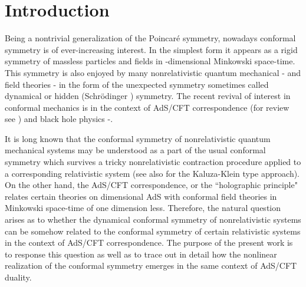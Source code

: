 \documentclass[a4paper,12pt]{article}
\begin{document}
\bigskip
\section{\protect\bigskip Introduction}


Being a nontrivial
generalization of
the Poincar\'e symmetry, nowadays conformal symmetry
is of ever-increasing interest.
In the simplest form it appears as a
rigid \coordHE{}
symmetry  of massless particles
and fields in \coordHE{}-dimensional Minkowski space-time.
This symmetry is also enjoyed by many
nonrelativistic quantum mechanical
\cite{AFF}-\cite{dgh}
and field theories \cite{Hag}-\cite{OR}
in the form of the unexpected \coordHE{} symmetry
sometimes called dynamical or hidden
(Schr\"odinger ) symmetry.
The recent revival of interest in conformal mechanics
is in the context of AdS/CFT correspondence
\cite{Mald,Gubs,WitE} (for review see \cite{Ahar})
and black hole physics \cite{kallosh}-\cite{Bell}.

It is long known that the
conformal \coordHE{} symmetry of nonrelativistic
quantum mechanical systems
may be understood  as a part
of the usual conformal \coordHE{} symmetry
which survives a tricky nonrelativistic
contraction procedure
applied to a corresponding relativistic
system \cite{BaRa}
(see also \cite{dgh,hh} for the Kaluza-Klein type approach).
On the other hand,
the AdS/CFT correspondence, or the ``holographic principle"
relates certain theories
on \coordHE{} dimensional AdS with conformal field theories in
Minkowski space-time of one dimension less.
Therefore, the natural question arises as to whether the
dynamical conformal symmetry of nonrelativistic systems
can be somehow related to the conformal symmetry
of certain relativistic systems in the
context of AdS/CFT correspondence.
The purpose of the present work is to response
this question as well as to trace out in detail
how the nonlinear realization of the conformal symmetry
emerges in the same
context of AdS/CFT duality.
\end{document}
